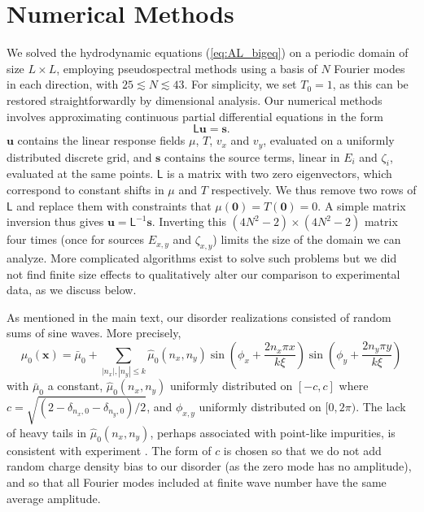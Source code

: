 \section{Numerical Methods}\label{appfin}
We solved the hydrodynamic equations (\ref{eq:AL_bigeq}) on a periodic domain of size $L\times L$, employing pseudospectral methods \cite{trefethen_spectral_2001} using a basis of $N$ Fourier modes in each direction, with $25 \lesssim N \lesssim 43$.   For simplicity, we set $T_0=1$, as this can be restored straightforwardly by dimensional analysis.   Our numerical methods involves approximating continuous partial differential equations in the form \begin{equation}
\mathsf{L} \mathbf{u} = \mathbf{s}.
\end{equation}
 $\mathbf{u}$ contains the linear response fields $\mu$, $T$, $v_x$ and $v_y$, evaluated on a uniformly distributed discrete grid, and $\mathbf{s}$ contains the source terms, linear in $E_i$ and $\zeta_i$, evaluated at the same points.   $\mathsf{L}$ is a matrix with two zero eigenvectors, which correspond to constant shifts in $\mu$ and $T$ respectively.  We thus remove two rows of $\mathsf{L}$ and replace them with constraints that $\mu(\mathbf{0}) = T(\mathbf{0}) = 0$.  A simple matrix inversion thus gives $\mathbf{u} = \mathsf{L}^{-1}\mathbf{s}$.   Inverting this $(4N^2-2)\times (4N^2-2)$ matrix four times (once for sources $E_{x,y}$ and $\zeta_{x,y}$) limits the size of the domain we can analyze.   More complicated algorithms exist \cite{smith_domain_2004} to solve such problems but we did not find finite size effects to qualitatively alter our comparison to experimental data, as we discuss below.
 
As mentioned in the main text, our disorder realizations consisted of random sums of sine waves.  More precisely, \begin{equation}
\mu_0(\mathbf{x}) = \bar\mu_0 + \sum_{|n_x|,|n_y| \le k} \hat\mu_0(n_x,n_y) \sin\left(\phi_x + \frac{2n_x\pi x}{k\xi}\right)\sin\left(\phi_y + \frac{2n_y\pi y}{k\xi}\right)
\end{equation} 
with $\bar\mu_0$ a constant, $\hat\mu_0(n_x,n_y)$ uniformly distributed on $[-c,c]$ where $c=\sqrt{(2-\delta_{n_x,0}-\delta_{n_y,0})/2}$, and $\phi_{x,y}$ uniformly distributed on $[0,2\pi)$.   The lack of heavy tails in $\hat\mu_0(n_x,n_y)$, perhaps associated with point-like impurities, is consistent with experiment \cite{martin_observation_2008}.  The form of $c$ is chosen so that we do not add random charge density bias to our disorder (as the zero mode has no amplitude), and so that all Fourier modes included at finite wave number have the same average amplitude.
 
